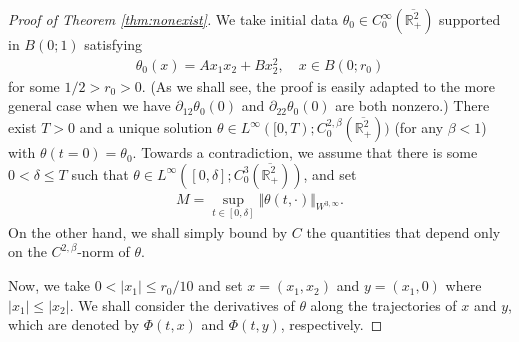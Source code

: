 \documentclass[10pt]{amsart}
\theoremstyle{definition}
\theoremstyle{remark}
\numberwithin{equation}{section}
\newcommand{\nrm}[1]{\Vert#1\Vert}
\newcommand{\rd}{\partial}
\newcommand{\0}{\emptyset}
\newcommand{\ohp}{\overline{\bbR^2_+}}
\newcommand{\bt}{\beta}
\newcommand{\dlt}{\delta}
\newcommand{\tht}{\theta}
\newcommand{\bbR}{\mathbb R}
\begin{document}
		\begin{proof}[Proof of Theorem \ref{thm:nonexist}]
			
			We take initial data $\tht_{0} \in C^{\infty}_{0}(\overline{\bbR^2_{+}})$ supported in {$B(0;1)$} satisfying  \begin{equation*}
				\begin{split}
					\tht_0(x) = A x_1x_2 + B x_2^2, \quad x \in {B(0;r_{0})}
				\end{split}
			\end{equation*} for some $1/2 > r_{0}>0$. {(As we shall see, the proof is easily adapted to the more general case when we have $\rd_{12}\tht_{0}(0)$ and   $\rd_{22}\tht_{0}(0)$ are both nonzero.)} There exist $T>0$ and a unique solution $\tht \in L^\infty([0,T);C^{2,\bt}_{0}(\overline{\bbR^2_{+}}))$ (for any $\bt<1$) with $\tht(t=0) = \tht_{0}$. Towards a contradiction, we assume that there is some $0<\dlt \le T$ such that $\tht \in L^\infty([0,\dlt];C^3_0(\ohp))$, and set \begin{equation}\label{eq:def-M}
				\begin{split}
					M = \sup_{ t \in [0,\dlt] } \nrm{\tht(t,\cdot)}_{W^{3,\infty}}. 
				\end{split}
			\end{equation} On the other hand, we shall simply bound by $C$ the quantities that depend only on the $C^{2,\bt}$-norm of $\tht$. 
			
			Now, we take $0 < |x_{1}| \le r_{0}/10$ and set $x = (x_1,x_2)$ and $y = (x_1,0)$ where $|x_{1}| \le |x_{2}|$. We shall consider the derivatives of $\tht$ along the trajectories of $x$ and $y$, which are denoted by $\Phi(t,x)$ and $\Phi(t,y)$, respectively. 
			
			
			\medskip 
			

\end{proof}
\end{document}
